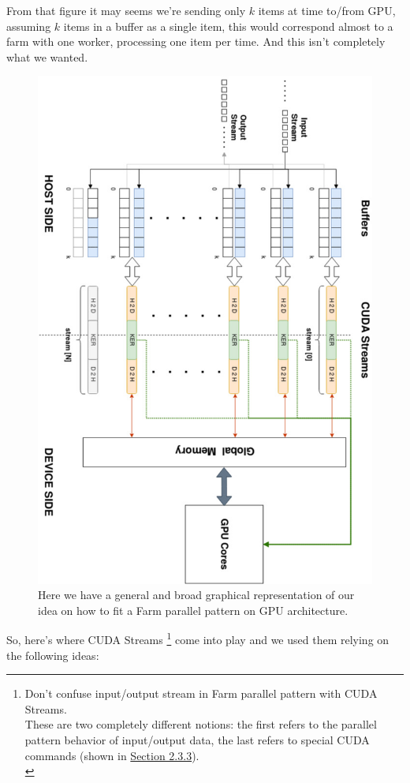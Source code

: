 	From that figure it may seems we're sending only \(k\) items at time to/from GPU, assuming \(k\) items in a buffer as a single item, this would correspond almost to a farm with one worker, processing one item per time. And this isn't completely what we wanted.\\
	\begin{figure}
		\vspace{-2cm}
		\includegraphics[scale=0.62,angle=-90]{images/overallLogic.jpg}
		\caption{Here we have a general and broad graphical representation of our idea on how to fit a Farm parallel pattern on GPU architecture.}
		\label{fig:overallLogic}
	\end{figure}
	So, here's where CUDA Streams \footnote{Don't confuse input/output stream in Farm parallel pattern with CUDA Streams.\\ These are two completely different notions: the first refers to the parallel pattern behavior of input/output data, the last refers to special CUDA commands (shown in \hyperref[subs:streams]{Section 2.3.3}).\\} come into play and we used them relying on the following ideas:
